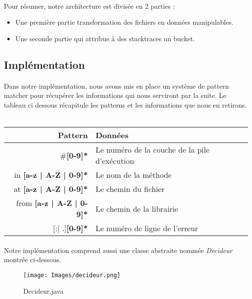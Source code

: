 \documentclass{article}
\begin{document}
\paragraph{}
Pour résumer, notre architecture est divisée en 2 parties :
\begin{itemize}
\item Une première partie transformation des fichiers en données manipulables.
\item Une seconde partie qui attribue à des stacktraces un bucket.
\end{itemize}

\subsection{Implémentation}

\paragraph{}
Dans notre implémentation, nous avons mis en place un système de pattern matcher pour récupérer les informations qui nous serviront par la suite. Le tableau ci dessous récapitule les patterns et les informations que nous en retirons.
~~\\

\begin{tabular}{|r|l|}
  \hline
  Pattern & Données \\
  \hline
  	{ \#\textbf{[0-9]*} } & Le numéro de la couche de la pile d'exécution \\
  \hline
  	{ in \textbf{[a-z | A-Z | 0-9]*} } & Le nom de la méthode \\
  \hline
  	{ at \textbf{[a-z | A-Z | 0-9]*} } & Le chemin du fichier \\
  \hline
	{ from \textbf{[a-z | A-Z | 0-9]*} } & Le chemin de la librairie \\
  \hline
	{ [:| .]\textbf{[0-9]*} } & Le numéro de ligne de l'erreur \\
  \hline
\end{tabular}

\paragraph{}
Notre implémentation comprend aussi une classe abstraite nommée \textit{Decideur} montrée ci-dessous.

\begin{figure}[h]
   \texttt{[image: Images/decideur.png]}
   \caption{Decideur.java}
\end{figure}
\end{document}

